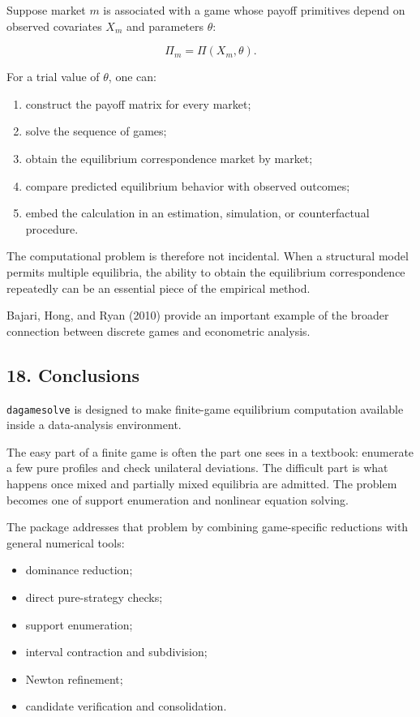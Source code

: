 \documentclass[11pt]{article}
\providecommand{\tightlist}{%
      \setlength{\itemsep}{0pt}\setlength{\parskip}{0pt}}
\begin{document}
Suppose market \(m\) is associated with a game whose payoff primitives
depend on observed covariates \(X_m\) and parameters \(\theta\):

\[
\Pi_m=\Pi(X_m,\theta).
\]

For a trial value of \(\theta\), one can:

\begin{enumerate}
\def\labelenumi{\arabic{enumi}.}
\tightlist
\item
  construct the payoff matrix for every market;
\item
  solve the sequence of games;
\item
  obtain the equilibrium correspondence market by market;
\item
  compare predicted equilibrium behavior with observed outcomes;
\item
  embed the calculation in an estimation, simulation, or counterfactual
  procedure.
\end{enumerate}

The computational problem is therefore not incidental. When a structural
model permits multiple equilibria, the ability to obtain the equilibrium
correspondence repeatedly can be an essential piece of the empirical
method.

Bajari, Hong, and Ryan (2010) provide an important example of the
broader connection between discrete games and econometric analysis.

    \hypertarget{conclusions}{%
\subsection{18. Conclusions}\label{conclusions}}

\texttt{dagamesolve} is designed to make finite-game equilibrium
computation available inside a data-analysis environment.

The easy part of a finite game is often the part one sees in a textbook:
enumerate a few pure profiles and check unilateral deviations. The
difficult part is what happens once mixed and partially mixed equilibria
are admitted. The problem becomes one of support enumeration and
nonlinear equation solving.

The package addresses that problem by combining game-specific reductions
with general numerical tools:

\begin{itemize}
\tightlist
\item
  dominance reduction;
\item
  direct pure-strategy checks;
\item
  support enumeration;
\item
  interval contraction and subdivision;
\item
  Newton refinement;
\item
  candidate verification and consolidation.
\end{itemize}
\end{document}
